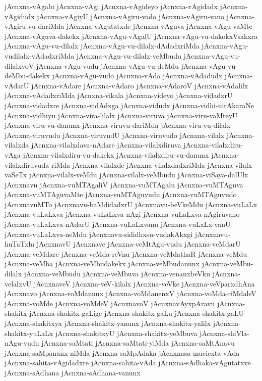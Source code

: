 {jAcnxna-vAgalu
jAcnxna-vAgi
jAcnxna-vAgideyo
jAcnxna-vAgidadx
jAcnxna-vAgidudx
jAcnxna-vAgiyU
jAcnxna-vAgiru-vado
jAcnxna-vAgiru-vano
jAcnxna-vAgiru-vu-dariMda
jAcnxna-vAgutatxde
jAcnxna-vAguva
jAcnxna-vAgu-vaMte
jAcnxna-vAguva-dakekx
jAcnxna-vAgu-vAgalU
jAcnxna-vAgu-vu-dakokxVsakxra
jAcnxna-vAgu-vu-dilalx
jAcnxna-vAgu-vu-dilalx-dAdadxriMda
jAcnxna-vAgu-vudilalx-vAdadxriMda
jAcnxna-vAgu-vu-dilalx-veMbudu
jAcnxna-vAgu-vu-dilalxvoV
jAcnxna-vAgu-vudu
jAcnxna-vAgu-vu-deMdu
jAcnxna-vAgu-vu-deMbu-dakekx
jAcnxna-vAgu-vudo
jAcnxna-vAda
jAcnxna-vAdadudx
jAcnxna-vAdarU
jAcnxna-vAdare
jAcnxna-vAdaro
jAcnxna-vAdaroV
jAcnxna-vAdalilx
jAcnxna-vAdadxriMda
jAcnxna-vikala
jAcnxna-videyo
jAcnxna-vidadxrU
jAcnxna-vidadxre
jAcnxna-vidAdxga
jAcnxna-vidudx
jAcnxna-vidhi-nirAkaraNe
jAcnxna-vidhiyu
jAcnxna-vira-lilalx
jAcnxna-viruva
jAcnxna-viru-vaMteyU
jAcnxna-viru-vu-danunx
jAcnxna-viruvu-dariMda
jAcnxna-viru-vu-dilalx
jAcnxna-viruvudu
jAcnxna-viruvudU
jAcnxna-viruvudo
jAcnxna-vilalx
jAcnxna-vilalxda
jAcnxna-vilalxdava-nAdare
jAcnxna-vilalxdiruva
jAcnxna-vilalxdiru-vAga
jAcnxna-vilalxdiru-vu-dakekx
jAcnxna-vilalxdiru-vu-danunx
jAcnxna-vilalxdiruvuda-riMda
jAcnxna-vilalxde
jAcnxna-vilalxdadxriMda
jAcnxna-vilalx-vaSeTx
jAcnxna-vilalx-veMdu
jAcnxna-vilalx-veMbudu
jAcnxna-viSaya-dalUlx
jAcnxnavu
jAcnxna-vuMTAgaliV
jAcnxna-vuMTAgalu
jAcnxna-vuMTAguva
jAcnxna-vuMTAguvaMte
jAcnxna-vuMTAguvudu
jAcnxna-vuMTAguvudo
jAcnxnavuMTo
jAcnxnavu-baMdidadxrU
jAcnxnavu-beVkeMdu
jAcnxna-vuLaLx
jAcnxna-vuLaLxva
jAcnxna-vuLaLxva-nAgi
jAcnxna-vuLaLxva-nAgiruvano
jAcnxna-vuLaLxva-nAdarU
jAcnxna-vuLaLxvanu
jAcnxna-vuLaLx-vanU
jAcnxna-vuLaLxva-neMdu
jAcnxnavu-sididhxsu-vudakAkxgi
jAcnxnavu-huTaTxlu
jAcnxnavU
jAcnxnave
jAcnxna-veMtAgu-vudu
jAcnxna-veMdarU
jAcnxna-veMdare
jAcnxna-veMda-reVnu
jAcnxna-veMdathaR
jAcnxna-veMdu
jAcnxna-veMba
jAcnxna-veMbudakekx
jAcnxna-veMbudanunx
jAcnxna-veMbu-dilalx
jAcnxna-veMbudu
jAcnxna-veMbuva
jAcnxna-venanxbeVku
jAcnxna-velalxvU
jAcnxnaveV
jAcnxna-veV-kilalx
jAcnxna-veVke
jAcnxna-veVparxdhAna
jAcnxnavo
jAcnxna-voMdanunx
jAcnxna-voMdanenxV
jAcnxna-voMda-riMdaleV
jAcnxna-voMde
jAcnxna-voMdeV
jAcnxnavoV
jAcnxnavAyxpAravu
jAcnxna-shakitx
jAcnxna-shakitx-gaLige
jAcnxna-shakitx-gaLu
jAcnxna-shakitx-gaLU
jAcnxna-shakitxya
jAcnxna-shakitx-yanunx
jAcnxna-shakitx-yalilx
jAcnxna-shakitx-yuLaLx
jAcnxna-shakitxyU
jAcnxna-shakitx-yeMbuva
jAcnxna-shiVla-nAgu-vudu
jAcnxna-saMtati
jAcnxna-saMtati-yiMda
jAcnxna-saMtAnavu
jAcnxna-saMpananx-niMda
jAcnxna-saMpAdaka
jAcnxnasa-mucicxta-vAda
jAcnxna-sahita-vAgidadxre
jAcnxna-sahita-vAda
jAcnxna-sAdhaka-vAgutatxve
jAcnxna-sAdhana
jAcnxna-sAdhana-vanunx
}
